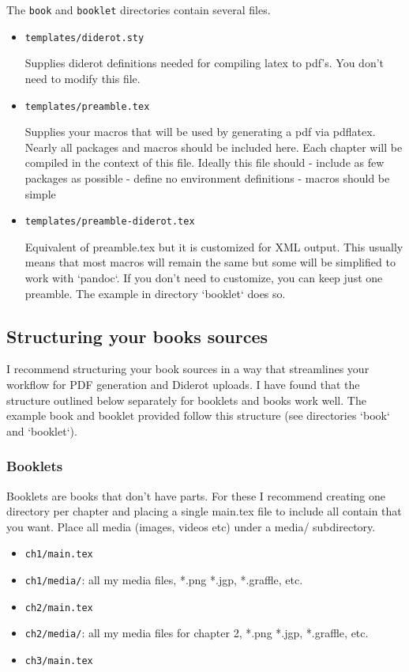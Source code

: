 The \lstinline`book` and \lstinline`booklet` directories contain several files.
%
\begin{itemize}
\item \lstinline`templates/diderot.sty`

   Supplies diderot definitions needed for compiling latex to pdf's.
   You don't need to modify this file.

\item \lstinline`templates/preamble.tex` 

   Supplies your macros that will be used by generating a pdf via pdflatex.  Nearly all packages and macros should be included here.  Each chapter will be compiled in the context of this file.  Ideally this file should
   - include as few packages as possible
   - define no environment definitions
   - macros should be simple

\item \lstinline`templates/preamble-diderot.tex` 

   Equivalent of preamble.tex but it is customized for XML output.  This usually means that most macros will remain the same but some will be simplified to work with `pandoc`.  If you don't need to customize, you can keep just one preamble.  The example in directory `booklet` does so.
\end{itemize}    

\subsection{Structuring your books sources}


I recommend structuring your book sources in a way that streamlines your workflow for PDF generation and Diderot uploads.  I have found that the structure outlined below separately for booklets and books work well.  The example book and booklet provided follow this structure (see directories `book` and `booklet`).

\subsubsection{Booklets}
 
 Booklets are books that don't have parts. For these  I recommend creating one directory per chapter and placing a single main.tex file to include all contain that you want.  Place all media (images, videos etc) under a media/ subdirectory. 
\begin{itemize}  
\item \lstinline`ch1/main.tex`
\item \lstinline`ch1/media/`: all my media files, *.png *.jgp, *.graffle, etc.
\item \lstinline`ch2/main.tex`
\item \lstinline`ch2/media/`: all my media files for chapter 2, *.png *.jgp, *.graffle, etc.
\item \lstinline`ch3/main.tex`
\end{itemize}

